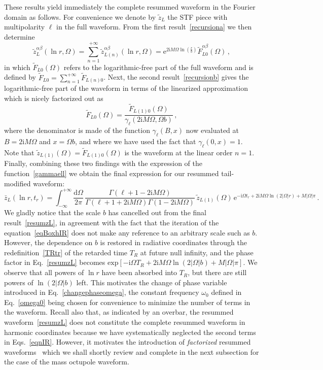 \documentclass[prd,preprint,superscriptaddress,tightenlines,nofootinbib,
  eqsecnum,showpacs]{revtex4}
\newcommand{\ud}{\mathrm{d}}
\newcommand{\ui}{\mathrm{i}}
\begin{document}
These results yield immediately the complete resummed waveform in the
Fourier domain as follows. For convenience we denote by $\tilde{z}_L$
the STF piece with multipolarity $\ell$ in the full waveform. From the
first result~\eqref{recursiona} we then determine
%
\begin{equation}\label{zLfull}
\tilde{z}^{\alpha\beta}_L(\ln r, \Omega) =
\sum_{n=1}^{+\infty}\tilde{z}^{\alpha\beta}_{L(n)}(\ln r,
\Omega)=\mathrm{e}^{2\ui M \Omega \ln\left(\frac{r}{b}\right)}
\tilde{F}^{\alpha\beta}_{L0}(\Omega)\,,
\end{equation}
%
in which $\tilde{F}_{L0}(\Omega)$ refers to the logarithmic-free part
of the full waveform and is defined by
$\tilde{F}_{L0}=\sum_{n=1}^{+\infty}\tilde{F}_{L(n)0}$. Next, the
second result~\eqref{recursionb} gives the logarithmic-free part of
the waveform in terms of the linearized approximation which is nicely
factorized out as
%
\begin{equation}\label{FL0full}
\tilde{F}_{L0}(\Omega) =
\frac{\tilde{F}_{L(1)0}(\Omega)}{\gamma_\ell(2\ui M \Omega,\Omega
  b)}\,,
\end{equation}
%
where the denominator is made of the function $\gamma_\ell(B,x)$
now evaluated at $B=2\ui M \Omega$ and $x=\Omega b$, and where
we have used the fact that $\gamma_\ell(0,x)=1$. Note that
$\tilde{z}_{L(1)}(\Omega)=\tilde{F}_{L(1)0}(\Omega)$ is the waveform
at the linear order $n=1$. Finally, combining these two findings with
the expression of the function~\eqref{gammaell} we obtain the final
expression for our resummed tail-modified waveform: 
%
\begin{equation}\label{resumzL}
\bar{z}_L(\ln r, t_r) = \int_{-\infty}^{+\infty} \!\frac{\ud
  \Omega}{2\pi} \,\frac{\Gamma(\ell+1-2\ui M
  \Omega)}{\Gamma(\ell+1+2\ui M \Omega)\Gamma(1-2\ui M
  \Omega)}\,\tilde{z}_{L(1)}(\Omega)\,\mathrm{e}^{- \ui \Omega t_r +
  2\ui M \Omega \ln\left(2 |\Omega| r\right)+M |\Omega|\pi} \,.
\end{equation}
%
We gladly notice that the scale $b$ has cancelled out from the final
result~\eqref{resumzL}, in agreement with the fact that the iteration
of the equation~\eqref{eqBoxhIR} does not make any reference to an
arbitrary scale such as $b$. However, the dependence on $b$ is
restored in radiative coordinates through the
redefinition~\eqref{TRtr} of the retarded time $T_R$ at future null
infinity, and the phase factor in Eq.~\eqref{resumzL} becomes
$\mathrm{exp}[-\ui \Omega T_R + 2 \ui M \Omega \ln(2 |\Omega| b)+M
  |\Omega| \pi]$. We observe that all powers of $\ln r$ have been
absorbed into $T_R$, but there are still powers of $\ln (2|\Omega| b)$
left. This motivates the change of phase variable introduced in
Eq.~\eqref{changephaseomega}, the constant frequency $\omega_0$
defined in Eq.~\eqref{omega0} being chosen for convenience to minimize
the number of terms in the waveform. Recall also that, as indicated by
an overbar, the resummed waveform~\eqref{resumzL} does not constitute
the complete resummed waveform in harmonic coordinates because we have
systematically neglected the second terms in
Eqs.~\eqref{eqnIR}. However, it motivates the introduction of
\textit{factorized} resummed waveforms~\cite{DIN09} which we shall
shortly review and complete in the next subsection for the case of the
mass octupole waveform.
\end{document}
